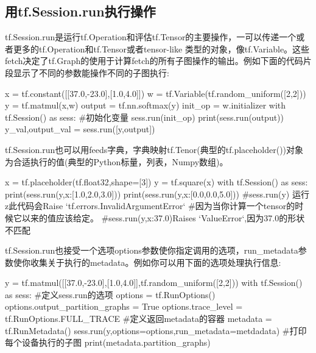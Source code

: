\subsection{用tf.Session.run执行操作}
tf.Session.run是运行tf.Operation和评估tf.Tensor的主要操作，一可以传递一个或者更多的tf.Operation和tf.Tensor或者tensor-like 类型的对象，像tf.Variable。这些fetch决定了tf.Graph的使用于计算fetch的所有子图操作的输出。例如下面的代码片段显示了不同的参数能操作不同的子图执行:
\begin{python}
x = tf.constant([[37.0,-23.0],[1.0,4.0]])
w = tf.Variable(tf.random_uniform([2,2]))
y = tf.matmul(x,w)
output = tf.nn.softmax(y)
init_op = w.initializer
with tf.Session() as sess:
#初始化变量
    sess.run(init_op)
    print(sess.run(output))
    y_val,output_val = sess.run([y,output])
\end{python}
tf.Session.run也可以用feeds字典，字典映射tf.Tenor(典型的tf.placeholder())对象为合适执行的值(典型的Python标量，列表，Numpy数组)。
\begin{python}
x = tf.placeholder(tf.float32,shape=[3])
y = tf.square(x)
with tf.Session() as sess:
    print(sess.run(y,{x:[1.0,2.0,3.0]}))
    print(sess.run(y,{x:[0.0,0.0,5.0]}))
    #sess.run(y) 运行z此代码会Raise  `tf.errors.InvalidArgumentError`
    #因为当你计算一个tensor的时候它以来的值应该给定。
    #sess.run(y,{x:37.0})Raises `ValueError`,因为37.0的形状不匹配
\end{python}
tf.Session.run也接受一个选项options参数使你指定调用的选项，run\_metadata参数使你收集关于执行的metadata。例如你可以用下面的选项处理执行信息:
\begin{python}
y = tf.matmul([[37.0,-23.0],[1.0,4.0]],tf.random_uniform([2,2]))
with tf.Session() as sess:
	#定义sess.run的选项
    options = tf.RunOptions()
    options.output_partition_graphs = True
    options.trace_level = tf.RunOptions.FULL_TRACE
#定义返回metadata的容器
metadata = tf.RunMetadata()
sess.run(y,options=options,run_metadata=metdadata)
#打印每个设备执行的子图
print(metadata.partition_graphs)
\end{python}
